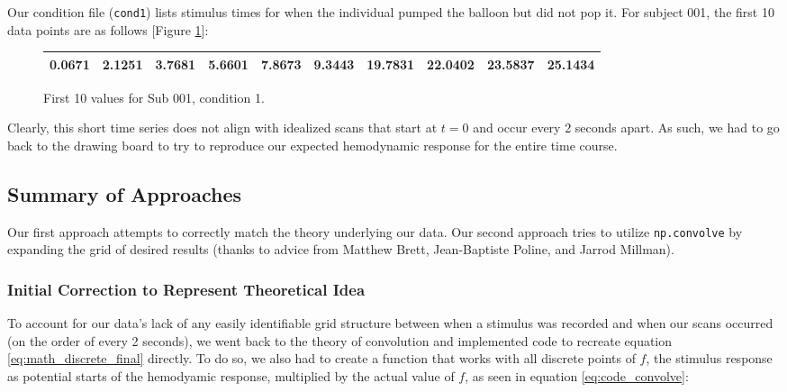 Our condition file (\texttt{cond1}) lists stimulus times for when the 
individual pumped the balloon but did not pop it. For subject 001, the 
first 10 data points are as follows [Figure \ref{table:cond1}]:

\vspace{5mm}

\begin{figure}[ht]
\begin{center}
\begin{tabular}{|cccccccccc|}
  \hline
0.0671 &
2.1251 &
3.7681 &
5.6601 &
7.8673 &
9.3443 &
19.7831 &
22.0402 &
23.5837 &
25.1434 \\
 \hline

  \end{tabular}
   \caption{First 10 values for Sub 001, condition 1.}
  \label{table:cond1}
\end{center}
\end{figure}
 
Clearly, this short time series does not align with idealized scans that 
start at $t=0$ and occur every 2 seconds apart. As such, we had to go back 
to the drawing board to try to reproduce our expected hemodynamic response for 
the entire time course.


\subsection{Summary of Approaches}
Our first approach attempts to correctly match the theory underlying our data. 
Our second approach tries to utilize \texttt{np.convolve} by expanding the 
grid of desired results (thanks to advice from  Matthew Brett, Jean-Baptiste 
Poline, and Jarrod Millman).


\subsubsection{Initial Correction to Represent Theoretical Idea}
To account for our data's lack of any easily identifiable grid structure 
between when a stimulus was recorded and when our scans occurred (on the 
order of every 2 seconds), we went back to the theory of convolution and 
implemented code to recreate equation \ref{eq:math_discrete_final} directly. 
To do so, we also had to create a function that works with all discrete points 
of $f$, the stimulus response as potential starts of the hemodyamic response, 
multiplied by the actual value of $f$, as seen in equation 
\ref{eq:code_convolve}:

